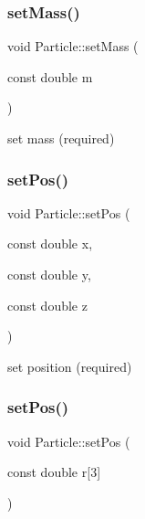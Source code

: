 \hypertarget{classParticle_a620f479862b90468a77da4e9cf5c0ff5}{}\label{classParticle_a620f479862b90468a77da4e9cf5c0ff5} 
\subsubsection{\texorpdfstring{set\+Mass()}{setMass()}}
{\footnotesize\ttfamily void Particle\+::set\+Mass (\begin{DoxyParamCaption}\item[{const double}]{m }\end{DoxyParamCaption})\hspace{0.3cm}{\ttfamily [inline]}}



set mass (required) 

\hypertarget{classParticle_a97d76b66aed57834c105b78b10643b81}{}\label{classParticle_a97d76b66aed57834c105b78b10643b81} 
\subsubsection{\texorpdfstring{set\+Pos()}{setPos()}\hspace{0.1cm}{\footnotesize\ttfamily [1/2]}}
{\footnotesize\ttfamily void Particle\+::set\+Pos (\begin{DoxyParamCaption}\item[{const double}]{x,  }\item[{const double}]{y,  }\item[{const double}]{z }\end{DoxyParamCaption})\hspace{0.3cm}{\ttfamily [inline]}}



set position (required) 

\hypertarget{classParticle_ab3c50e74691f9264d4d4d2e72a6b9536}{}\label{classParticle_ab3c50e74691f9264d4d4d2e72a6b9536} 
\subsubsection{\texorpdfstring{set\+Pos()}{setPos()}\hspace{0.1cm}{\footnotesize\ttfamily [2/2]}}
{\footnotesize\ttfamily void Particle\+::set\+Pos (\begin{DoxyParamCaption}\item[{const double}]{r\mbox{[}3\mbox{]} }\end{DoxyParamCaption})\hspace{0.3cm}{\ttfamily [inline]}}




